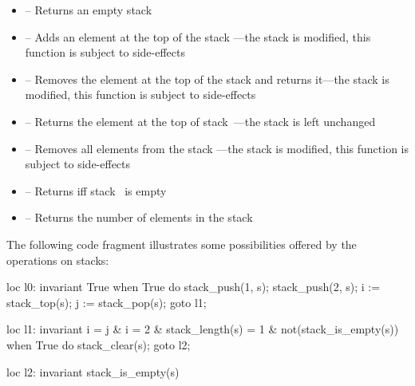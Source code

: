 \begin{itemize}
	\item {} -- Returns an empty stack

	\item \label{item:lbl-stack_push}  -- Adds an element  at the top of the stack ---the stack is modified, this function is subject to side-effects

	\item \label{item:lbl-stack_pop}  -- Removes the element at the top of the stack  and returns it---the stack is modified, this function is subject to side-effects

	\item \label{item:lbl-stack_top}  -- Returns the element at the top of stack~---the stack is left unchanged

	\item \label{item:lbl-stack_clear}  -- Removes all elements from the stack ---the stack is modified, this function is subject to side-effects

	\item \label{item:lbl-stack_is_empty}  -- Returns  iff stack~ is empty

	\item \label{item:lbl-stack_length}  -- Returns the number of elements in the stack 
\end{itemize}

\begin{example}
	The following code fragment illustrates some possibilities offered by the operations on stacks:

\begin{IMITATORmodel}
loc l0: invariant True
	when True do {
		stack_push(1, s);
		stack_push(2, s);
		i := stack_top(s);
		j := stack_pop(s);
	}
	goto l1;

loc l1: invariant
	i = j
	& i = 2
	& stack_length(s) = 1
	& not(stack_is_empty(s))
	when True do { stack_clear(s); }
	goto l2;

loc l2: invariant stack_is_empty(s)
\end{IMITATORmodel}

\end{example}




